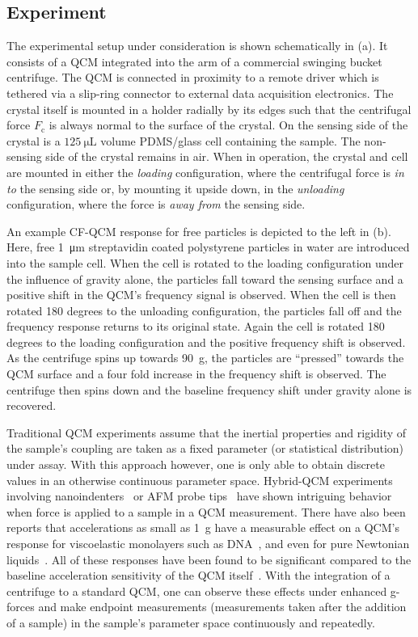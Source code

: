 \subsection*{Experiment}
The experimental setup under consideration is shown schematically in
(a).  It consists of a QCM integrated into the arm of
a commercial swinging bucket centrifuge.  The QCM is connected in proximity
to a remote driver which is tethered via a slip-ring connector to external
data acquisition electronics.  The crystal itself is mounted in a holder
radially by its edges such that the centrifugal force $F_\mathrm{c}$ is
always normal to the surface of the crystal.  On the sensing side of the
crystal is a $\SI{125}{\micro\liter}$ volume PDMS/glass cell containing the
sample.  The non-sensing side of the crystal remains in air.
When in
operation, the crystal and cell are mounted in either the \textit{loading}
configuration, where the centrifugal force is \textit{in to} the sensing
side or, by mounting it upside down, in the \textit{unloading}
configuration, where the force is \textit{away from} the sensing side.

An example CF-QCM response for free particles is depicted to the left in
(b).  Here, free \SI{1}{\micro\meter} streptavidin
coated polystyrene particles in water are introduced into the sample cell.
When the cell is rotated to the loading configuration under the influence
of gravity alone, the particles fall toward the sensing surface and a positive
shift in the QCM's frequency signal is observed.  When the cell is then
rotated 180 degrees to the unloading configuration, the particles fall off
and the frequency response returns to its original state.  Again the cell
is rotated 180 degrees to the loading configuration and the positive
frequency shift is observed.  As the centrifuge spins up towards
\SI{90}{g}, the particles are ``pressed'' towards the QCM surface and a
four fold increase in the frequency shift is observed.  The centrifuge then
spins down and the baseline frequency shift under gravity alone is
recovered.

Traditional QCM experiments assume that the inertial properties and
rigidity of the sample's coupling are taken as a fixed parameter (or
statistical distribution) under assay.  With this approach however, one is
only able to obtain discrete values in an otherwise continuous parameter space.  Hybrid-QCM experiments
involving nanoindenters~\cite{borovsky2001measuring} or AFM probe
tips~\cite{richter2003pathways} have shown intriguing behavior when force
is applied to a sample in a QCM measurement.  There have also been reports
that accelerations as small as \SI{1}{g} have a measurable effect on a
QCM's response for viscoelastic monolayers such as
DNA~\cite{fawcett2004evidence}, and even for pure Newtonian
liquids~\cite{yoshimoto2002effect}.  All of these responses have been found
to be significant compared to the baseline acceleration sensitivity of the
QCM itself~\cite{filler1988acceleration}.  With the integration of a
centrifuge to a standard QCM, one can observe these effects under enhanced
g-forces and make endpoint measurements (measurements taken after the
addition of a sample) in the sample's parameter space continuously and
repeatedly.

